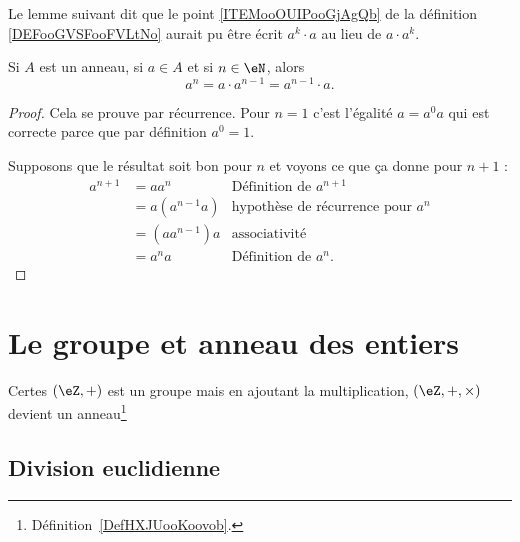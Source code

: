 Le lemme suivant dit que le point \ref{ITEMooOUIPooGjAgQb} de la définition \ref{DEFooGVSFooFVLtNo} aurait pu être écrit \( a^k\cdot a\) au lieu de \( a\cdot a^k\).
\begin{lemma}        \label{LEMooWPARooYLZlzr}
    Si \( A\) est un anneau, si \( a\in A\) et si \( n\in \eN\), alors
    \begin{equation}
        a^n=a\cdot a^{n-1}=a^{n-1}\cdot a.
    \end{equation}
\end{lemma}

\begin{proof}
    Cela se prouve par récurrence. Pour \( n=1\) c'est l'égalité \( a=a^0a\) qui est correcte parce que par définition \( a^0=1\).

    Supposons que le résultat soit bon pour \( n\) et voyons ce que ça donne pour \( n+1\) :
    \begin{subequations}
        \begin{align}
            a^{n+1}&=aa^n      &\text{Définition de } a^{n+1}     \\
            &=a(a^{n-1}a)       &\text{hypothèse de récurrence pour } a^n\\
            &=(aa^{n-1})a       &\text{associativité}\\
            &=a^na          &\text{Définition de } a^n.
        \end{align}
    \end{subequations}
\end{proof}

\section{Le groupe et anneau des entiers}

Certes \( (\eZ,+)\) est un groupe mais en ajoutant la multiplication, \( (\eZ,+,\times)\) devient un anneau\footnote{Définition~\ref{DefHXJUooKoovob}.} 

\subsection{Division euclidienne}

